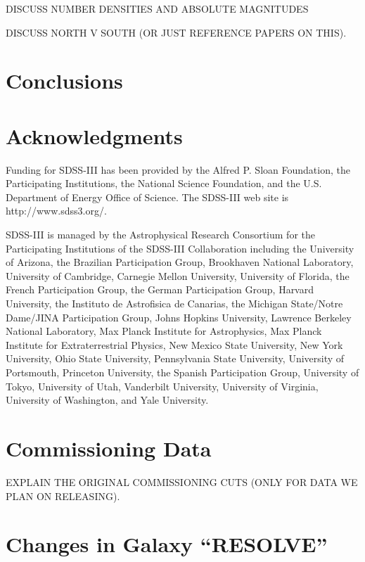 \documentclass[preprint]{aastex}
\begin{document}
DISCUSS NUMBER DENSITIES AND ABSOLUTE MAGNITUDES

DISCUSS NORTH V SOUTH (OR JUST REFERENCE PAPERS ON THIS).

\section{Conclusions}


\section{Acknowledgments}

Funding for SDSS-III has been provided by the Alfred P. Sloan
Foundation, the Participating Institutions, the National Science
Foundation, and the U.S. Department of Energy Office of Science. The
SDSS-III web site is http://www.sdss3.org/.

SDSS-III is managed by the Astrophysical Research Consortium for the
Participating Institutions of the SDSS-III Collaboration including the
University of Arizona,
the Brazilian Participation Group,
Brookhaven National Laboratory,
University of Cambridge,
Carnegie Mellon University,
University of Florida,
the French Participation Group,
the German Participation Group,
Harvard University,
the Instituto de Astrofisica de Canarias,
the Michigan State/Notre Dame/JINA Participation Group,
Johns Hopkins University,
Lawrence Berkeley National Laboratory,
Max Planck Institute for Astrophysics,
Max Planck Institute for Extraterrestrial Physics,
New Mexico State University,
New York University,
Ohio State University,
Pennsylvania State University,
University of Portsmouth,
Princeton University,
the Spanish Participation Group,
University of Tokyo,
University of Utah,
Vanderbilt University,
University of Virginia,
University of Washington,
and Yale University.

\appendix

\section{Commissioning Data}
\label{app:comm}

EXPLAIN THE ORIGINAL COMMISSIONING CUTS (ONLY FOR DATA WE PLAN ON RELEASING). 


\section{Changes in Galaxy ``RESOLVE''}
\label{app:resolve}
\end{document}
